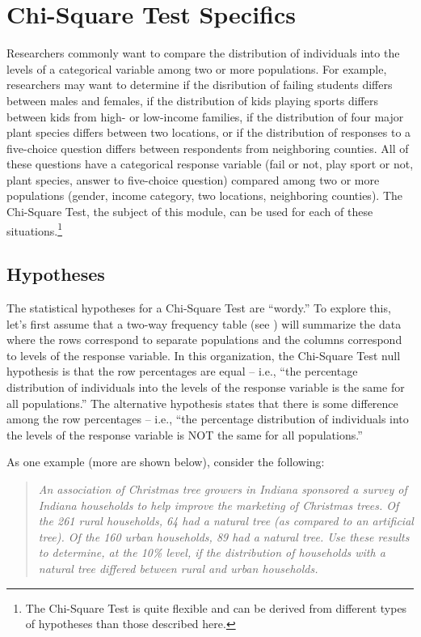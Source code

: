 \documentclass[10pt,openany]{book}\usepackage[]{graphicx}\usepackage[]{color}
\begin{document}
\section{Chi-Square Test Specifics}
\vspace{-3pt}
Researchers commonly want to compare the distribution of individuals into the levels of a categorical variable among two or more populations. For example, researchers may want to determine if the disribution of failing students differs between males and females, if the distribution of kids playing sports differs between kids from high- or low-income families, if the distribution of four major plant species differs between two locations, or if the distribution of responses to a five-choice question differs between respondents from neighboring counties. All of these questions have a categorical response variable (fail or not, play sport or not, plant species, answer to five-choice question) compared among two or more populations (gender, income category, two locations, neighboring counties). The Chi-Square Test, the subject of this module, can be used for each of these situations.\footnote{The Chi-Square Test is quite flexible and can be derived from different types of hypotheses than those described here.}

\subsection{Hypotheses}
The statistical hypotheses for a Chi-Square Test are ``wordy.''  To explore this, let's first assume that a two-way frequency table (see ) will summarize the data where the rows correspond to separate populations and the columns correspond to levels of the response variable. In this organization, the Chi-Square Test null hypothesis is that the row percentages are equal -- i.e., ``the percentage distribution of individuals into the levels of the response variable is the same for all populations.''  The alternative hypothesis states that there is some difference among the row percentages -- i.e., ``the percentage distribution of individuals into the levels of the response variable is NOT the same for all populations.''

As one example (more are shown below), consider the following:
\vspace{-6pt}
\begin{quote}
\textsl{An association of Christmas tree growers in Indiana sponsored a survey of Indiana households to help improve the marketing of Christmas trees. Of the 261 rural households, 64 had a natural tree (as compared to an artificial tree). Of the 160 urban households, 89 had a natural tree. Use these results to determine, at the 10\% level, if the distribution of households with a natural tree differed between rural and urban households.}
\end{quote}
\vspace{-3pt}
\end{document}
